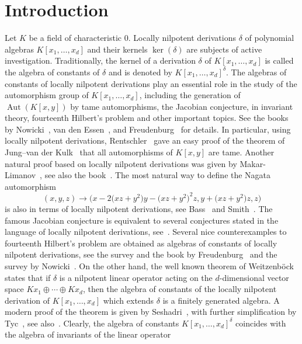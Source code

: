 \section{Introduction}
Let $K$ be a field of characteristic 0. Locally nilpotent derivations $\delta$ of polynomial algebras $K[x_1,\ldots,x_d]$ and their kernels $\ker(\delta)$ are subjects of active investigation. Traditionally, the kernel of a derivation $\delta$ of $K[x_1,\ldots,x_d]$ is called the algebra of constants of $\delta$ and is denoted by $K[x_1,\ldots,x_d]^{\delta}$. The algebras of constants of locally nilpotent derivations play an essential role in the study of the automorphism group of $K[x_1,\ldots,x_d]$,
including the generation of $\operatorname{Aut}(K[x,y])$ by tame automorphisms, the Jacobian conjecture, in invariant theory, fourteenth Hilbert's problem and other important topics. See the books by Nowicki~\cite{No1}, van den Essen~\cite{E}, and Freudenburg~\cite{Fr2} for details. In particular, using locally nilpotent derivations,
Rentschler~\cite{R} gave an easy proof of the theorem of Jung--van der Kulk~\cite{J, K} that all automorphisms of $K[x,y]$ are tame. Another natural proof based on locally nilpotent derivations was given by Makar-Limanov~\cite{ML2}, see also the book~\cite{D1}. The most natural way to define the Nagata automorphism~\cite{Na}
\[
(x,y,z)\to\big(x-2\big(xz+y^2\big)y-\big(xz+y^2\big)^2z,y+\big(xz+y^2\big)z,z\big)
\]
is also in terms of locally nilpotent derivations, see Bass~\cite{B} and Smith~\cite{Sm}. The famous Jacobian conjecture is equivalent to several conjectures stated in the language of locally nilpotent derivations, see~\cite{E}. Several nice counterexamples to fourteenth Hilbert's problem are obtained as algebras of constants of locally nilpotent derivations, see the survey and the book by Freudenburg~\cite{Fr1, Fr2} and the survey by Nowicki~\cite{No2}. On the other hand, the well known theorem of Weitzenb\"ock~\cite{W} states that if $\delta$ is a nilpotent linear operator acting on the $d$-dimensional vector space $Kx_1\oplus \cdots\oplus Kx_d$, then the algebra of constants of the locally nilpotent derivation of $K[x_1,\ldots,x_d]$ which extends $\delta$ is a finitely generated algebra. A modern proof of the theorem is given by Seshadri~\cite{Ses}, with further simplification by Tyc~\cite{T}, see also~\cite{No1}. Clearly, the algebra of constants $K[x_1,\ldots,x_d]^{\delta}$ coincides with the algebra of invariants of the linear operator
